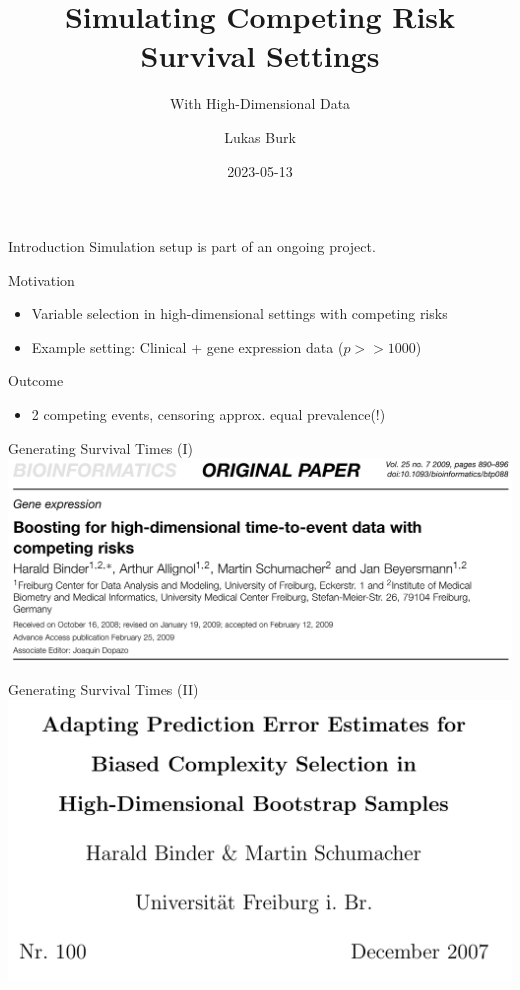 \documentclass{beamer}
\title{Simulating Competing Risk Survival Settings}
\subtitle{With High-Dimensional Data}
\author{Lukas Burk}
\date{2023-05-13}
\providecommand{\tightlist}{%
  \setlength{\itemsep}{0pt}\setlength{\parskip}{0pt}}
\begin{document}
\frame{\maketitle}

\begin{frame}{Introduction}
\protect\hypertarget{introduction}{}
Simulation setup is part of an ongoing project.

\begin{block}{Motivation}
\protect\hypertarget{motivation}{}
\begin{itemize}
\tightlist
\item
  Variable selection in high-dimensional settings with competing risks
\item
  Example setting: Clinical + gene expression data (\(p >> 1000\))
\end{itemize}
\end{block}

\begin{block}{Outcome}
\protect\hypertarget{outcome}{}
\begin{itemize}
\tightlist
\item
  2 competing events, censoring approx. equal prevalence(!)
\end{itemize}
\end{block}
\end{frame}

\begin{frame}{Generating Survival Times (I)}
\protect\hypertarget{generating-survival-times-i}{}
\includegraphics[width=0.95\linewidth]{img/binder2009}

\textcite{binder2009boostinghighdimensional}
\end{frame}

\begin{frame}{Generating Survival Times (II)}
\protect\hypertarget{generating-survival-times-ii}{}
\includegraphics[width=0.95\linewidth]{img/binder2007}

\textcite{binder2008adaptingprediction}
\end{frame}
\end{document}
